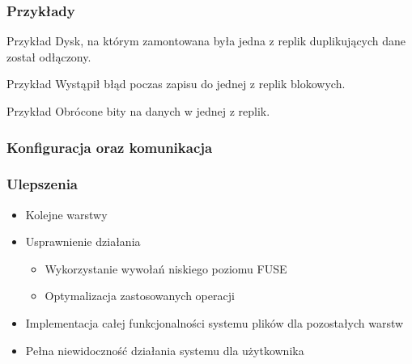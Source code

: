 \documentclass{beamer}
\begin{document}
	\begin{frame}
		\frametitle{Przykłady}
		\begin{block}{Przykład}
			Dysk, na którym zamontowana była jedna z replik duplikujących dane został odłączony. 
		\end{block}
		\pause
		\begin{block}{Przykład}
			Wystąpił błąd poczas zapisu do jednej z replik blokowych.
		\end{block}
		\pause
		\begin{block}{Przykład}
			Obrócone bity na danych w jednej z replik.
		\end{block}
	\end{frame}
	
	\begin{frame}
		\frametitle{Konfiguracja oraz komunikacja}

	\end{frame}

	\begin{frame}
		\frametitle{Ulepszenia}
		\begin{itemize}
			\item Kolejne warstwy
			\item Usprawnienie działania
			\begin{itemize}
				\item Wykorzystanie wywołań niskiego poziomu FUSE
				\item Optymalizacja zastosowanych operacji
			\end{itemize}
			\item Implementacja całej funkcjonalności systemu plików dla pozostałych warstw
			\item Pełna niewidoczność działania systemu dla użytkownika
		\end{itemize}
	\end{frame}
\end{document}
